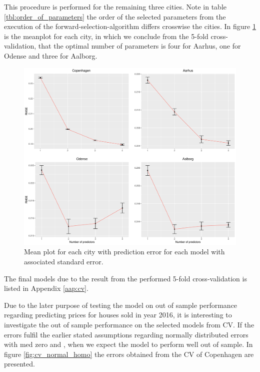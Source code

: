 This procedure is performed for the remaining three cities. Note in table \ref{tbl:order_of_parameters} the order of the selected parameters from the execution of the forward-selection-algorithm differs crosswise the cities. In figure \ref{fig:CrossValidationSamlet} is the meanplot for each city, in which we conclude from the 5-fold cross-validation, that the optimal number of parameters is four for Aarhus, one for Odense and three for Aalborg.
\begin{figure}[H]
    \centering
  \includegraphics[width = 1 \textwidth]{figures/Nanna/CrossValidationSamlet.pdf}
  \caption{Mean plot for each city with prediction error for each model with associated standard error.}
  \label{fig:CrossValidationSamlet}
\end{figure}

The final models due to the result from the performed 5-fold cross-validation is listed in Appendix \ref{aap:cv}.

Due to the later purpose of testing the model on out of sample performance regarding predicting prices for houses sold in year 2016, it is interesting to investigate the out of sample performance on the selected models from CV. If the errors fulfil the earlier stated assumptions regarding normally distributed errors with med zero and \homo, when we expect the model to perform well out of sample. In figure \ref{fig:cv_normal_homo} the errors obtained from the CV of Copenhagen are presented.

